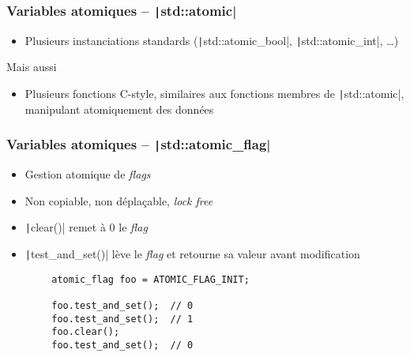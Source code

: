 \documentclass[C++.tex]{subfiles}
\begin{document}
\begin{frame}[fragile]
	\frametitle{Variables atomiques -- \texttt|std::atomic|}
	\begin{itemize}
		\item Plusieurs instanciations standards (\texttt|std::atomic_bool|, \texttt|std::atomic_int|, \ldots{})
	\end{itemize}

	\begin{block}{Mais aussi}
		\begin{itemize}
			\item Plusieurs fonctions \og C-style\fg{}, similaires aux fonctions membres de \texttt|std::atomic|, manipulant atomiquement des données
		\end{itemize}
	\end{block}
\end{frame}

\begin{frame}[fragile]
	\frametitle{Variables atomiques -- \texttt|std::atomic_flag|}
	\begin{itemize}
		\item Gestion atomique de \textit{flags}
		\item Non copiable, non déplaçable, \textit{lock free}
		\item \texttt|clear()| remet à 0 le \textit{flag}
		\item \texttt|test_and_set()| lève le \textit{flag} et retourne sa valeur avant modification
	\end{itemize}

	\begin{verbatim}
		atomic_flag foo = ATOMIC_FLAG_INIT;

		foo.test_and_set();  // 0
		foo.test_and_set();  // 1
		foo.clear();
		foo.test_and_set();  // 0
	\end{verbatim}
\end{frame}
\end{document}
